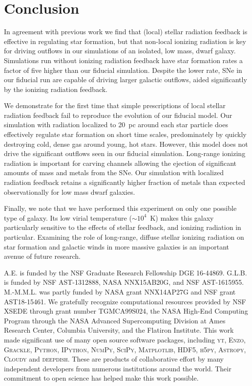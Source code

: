 \documentclass[twocolumn]{aastex62}
\begin{document}
\section{Conclusion}  \label{sec:conclusion}
In agreement with previous work we find that (local) stellar radiation feedback is effective in regulating star formation, but that non-local ionizing radiation is key for driving outflows in our simulations of an isolated, low mass, dwarf galaxy. Simulations run without ionizing radiation feedback have star formation rates a factor of five higher than our fiducial simulation. Despite the lower rate, SNe in our fiducial run are capable of driving larger galactic outflows, aided significantly by the ionizing radiation feedback.

We demonstrate for the first time that simple prescriptions of local stellar radiation feedback fail to reproduce the evolution of our fiducial model. Our simulation with radiation localized to 20~pc around each star particle does effectively regulate star formation on short time scales, predominately by quickly destroying cold, dense gas around young, hot stars. However, this model does not drive the significant outflows seen in our fiducial simulation. Long-range ionizing radiation is important for carving channels allowing the ejection of significant amounts of mass and metals from the SNe. Our simulation with localized radiation feedback retains a significantly higher fraction of metals than expected observationally for low mass dwarf galaxies.  

Finally, we note that we have performed this experiment on only one possible type of galaxy. Its low virial temperature ($\sim10^{4}$~K) makes this galaxy particularly sensitive to the effects of stellar feedback, and ionizing radiation in particular. Examining the role of long-range, diffuse stellar ionizing radiation on star formation and galactic winds in more massive galaxies is an important avenue of future research. 

\acknowledgments
A.E. is funded by the NSF Graduate Research Fellowship DGE 16-44869. G.L.B. is funded by NSF AST-1312888, NASA NNX15AB20G, and NSF AST-1615955. M.-M.M.L. was partly funded by NASA  grant NNX14AP27G and NSF grant AST18-15461. We gratefully recognize computational resources provided by NSF XSEDE through grant number TGMCA99S024, the NASA High-End Computing Program through the NASA Advanced Supercomputing Division at Ames Research Center, Columbia University, and the Flatiron Institute. This work made significant use of many open source software packages, including \textsc{yt}, \textsc{Enzo}, \textsc{Grackle}, \textsc{Python}, \textsc{IPython}, \textsc{NumPy}, \textsc{SciPy}, \textsc{Matplotlib}, \textsc{HDF5}, \textsc{h5py}, \textsc{Astropy}, \textsc{Cloudy} and \textsc{deepdish}. These are products of collaborative effort by many independent developers from numerous institutions around the world. Their commitment to open science has helped make this work possible. 
\end{document}
